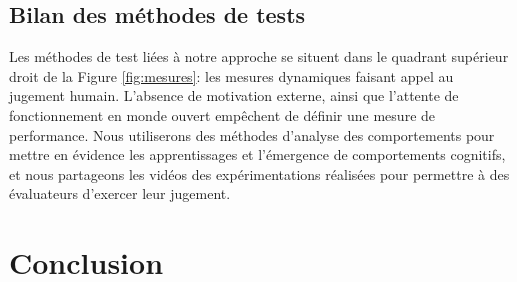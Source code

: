 \subsection{Bilan des méthodes de tests}

\noindent
Les méthodes de test liées à notre approche se situent dans le quadrant supérieur droit de la Figure \ref{fig:mesures}: les mesures dynamiques faisant appel au jugement humain.
L'absence de motivation externe, ainsi que l'attente de fonctionnement en monde ouvert empêchent de définir une mesure de performance. 
Nous utiliserons des méthodes d'analyse des comportements pour mettre en évidence les apprentissages et l'émergence de comportements cognitifs, et nous partageons les vidéos des expérimentations réalisées pour permettre à des évaluateurs d'exercer leur jugement.










\section{Conclusion}

